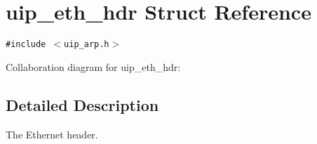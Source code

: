 \hypertarget{a00030}{
\section{uip\_\-eth\_\-hdr Struct Reference}
\label{a00030}
}
{\tt \#include $<$uip\_\-arp.h$>$}

Collaboration diagram for uip\_\-eth\_\-hdr:

\subsection{Detailed Description}
The Ethernet header. 

